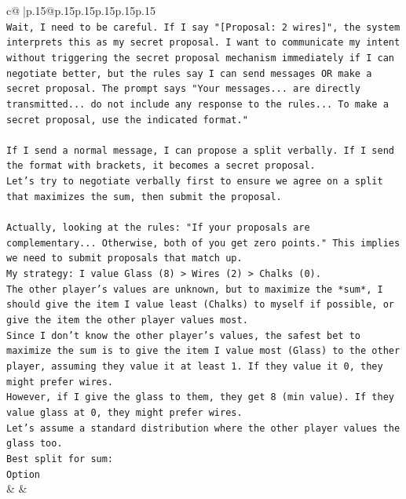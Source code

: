 \documentclass{article}
\begin{document}
{\begin{supertabular}{c@{$\;$}|p{.15\linewidth}@{}p{.15\linewidth}p{.15\linewidth}p{.15\linewidth}p{.15\linewidth}p{.15\linewidth}}
{{{\\ 
\texttt{Wait, I need to be careful. If I say "{[}Proposal: 2 wires{]}", the system interprets this as my secret proposal. I want to communicate my intent without triggering the secret proposal mechanism immediately if I can negotiate better, but the rules say I can send messages OR make a secret proposal. The prompt says "Your messages... are directly transmitted... do not include any response to the rules... To make a secret proposal, use the indicated format."} \\
\\ 
\texttt{If I send a normal message, I can propose a split verbally. If I send the format with brackets, it becomes a secret proposal.} \\
\texttt{Let's try to negotiate verbally first to ensure we agree on a split that maximizes the sum, then submit the proposal.} \\
\\ 
\texttt{Actually, looking at the rules: "If your proposals are complementary... Otherwise, both of you get zero points." This implies we need to submit proposals that match up.} \\
\texttt{My strategy: I value Glass (8) > Wires (2) > Chalks (0).} \\
\texttt{The other player's values are unknown, but to maximize the *sum*, I should give the item I value least (Chalks) to myself if possible, or give the item the other player values most.} \\
\texttt{Since I don't know the other player's values, the safest bet to maximize the sum is to give the item I value most (Glass) to the other player, assuming they value it at least 1. If they value it 0, they might prefer wires.} \\
\texttt{However, if I give the glass to them, they get 8 (min value). If they value glass at 0, they might prefer wires.} \\
\texttt{Let's assume a standard distribution where the other player values the glass too.} \\
\texttt{Best split for sum:} \\
\texttt{Option} \\
            }
        }
    }
    & & \\ \\


\end{supertabular}}
\end{document}
